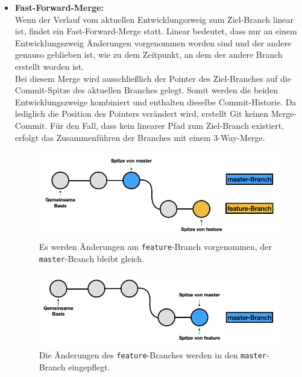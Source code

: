 \begin{itemize}
	\item \textbf{Fast-Forward-Merge:}\\
		Wenn der Verlauf vom aktuellen Entwicklungszweig zum Ziel-Branch linear ist, findet ein Fast-Forward-Merge
		statt. Linear bedeutet, dass nur an einem Entwicklungszweig Änderungen vorgenommen worden sind und der 
		andere genauso geblieben ist, wie zu dem Zeitpunkt, an dem der andere Branch erstellt worden ist.\\
		Bei diesem Merge wird ausschließlich der Pointer des Ziel-Branches auf die Commit-Spitze des aktuellen 
		Branches gelegt. Somit werden die beiden Entwicklungszweige kombiniert und enthalten dieselbe 
		Commit-Historie. Da lediglich die Position des Pointers verändert wird, erstellt Git keinen Merge-Commit. 
		Für den Fall, dass kein linearer Pfad zum Ziel-Branch existiert, erfolgt das Zusammenführen der Branches
		mit einem 3-Way-Merge. 
		
		\begin{figure}[H]
		\begin{center}
			\includegraphics[scale=.8]{images/git-fast-forward-merge-before.png}
		\end{center}
			\caption{Es werden Änderungen am \texttt{feature}-Branch vorgenommen, der \texttt{master}-Branch
				bleibt gleich.}
		\end{figure}
		
		\begin{figure}[H]
		\begin{center}
			\includegraphics[scale=.8]{images/git-fast-forward-merge-after.png}
		\end{center}
			\caption{Die Änderungen des \texttt{feature}-Branches werden in den \texttt{master}-Branch eingepflegt.}
		\end{figure}
		

\end{itemize}
